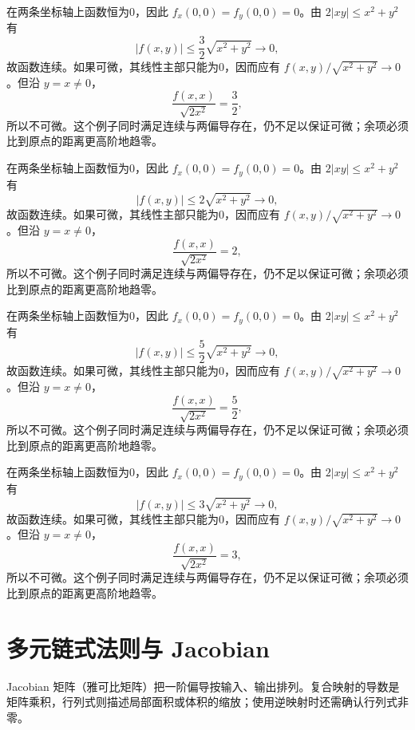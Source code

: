 \documentclass[12pt,fontset=fandol]{ctexart}
\begin{document}
\begin{solve}\label{ans:c32q22}
在两条坐标轴上函数恒为0，因此 $f_x(0,0)=f_y(0,0)=0$。由 $2|xy|\le x^2+y^2$ 有
\[
|f(x,y)|\le \frac{3}{2}\sqrt{x^2+y^2}\to0,
\]
故函数连续。如果可微，其线性主部只能为0，因而应有 $f(x,y)/\sqrt{x^2+y^2}\to0$。但沿 $y=x\ne0$，
\[
\frac{f(x,x)}{\sqrt{2x^2}}=\frac{3}{2},
\]
所以不可微。这个例子同时满足连续与两偏导存在，仍不足以保证可微；余项必须比到原点的距离更高阶地趋零。
\end{solve}

\begin{solve}\label{ans:c32q23}
在两条坐标轴上函数恒为0，因此 $f_x(0,0)=f_y(0,0)=0$。由 $2|xy|\le x^2+y^2$ 有
\[
|f(x,y)|\le 2\sqrt{x^2+y^2}\to0,
\]
故函数连续。如果可微，其线性主部只能为0，因而应有 $f(x,y)/\sqrt{x^2+y^2}\to0$。但沿 $y=x\ne0$，
\[
\frac{f(x,x)}{\sqrt{2x^2}}=2,
\]
所以不可微。这个例子同时满足连续与两偏导存在，仍不足以保证可微；余项必须比到原点的距离更高阶地趋零。
\end{solve}

\begin{solve}\label{ans:c32q24}
在两条坐标轴上函数恒为0，因此 $f_x(0,0)=f_y(0,0)=0$。由 $2|xy|\le x^2+y^2$ 有
\[
|f(x,y)|\le \frac{5}{2}\sqrt{x^2+y^2}\to0,
\]
故函数连续。如果可微，其线性主部只能为0，因而应有 $f(x,y)/\sqrt{x^2+y^2}\to0$。但沿 $y=x\ne0$，
\[
\frac{f(x,x)}{\sqrt{2x^2}}=\frac{5}{2},
\]
所以不可微。这个例子同时满足连续与两偏导存在，仍不足以保证可微；余项必须比到原点的距离更高阶地趋零。
\end{solve}

\begin{solve}\label{ans:c32q25}
在两条坐标轴上函数恒为0，因此 $f_x(0,0)=f_y(0,0)=0$。由 $2|xy|\le x^2+y^2$ 有
\[
|f(x,y)|\le 3\sqrt{x^2+y^2}\to0,
\]
故函数连续。如果可微，其线性主部只能为0，因而应有 $f(x,y)/\sqrt{x^2+y^2}\to0$。但沿 $y=x\ne0$，
\[
\frac{f(x,x)}{\sqrt{2x^2}}=3,
\]
所以不可微。这个例子同时满足连续与两偏导存在，仍不足以保证可微；余项必须比到原点的距离更高阶地趋零。
\end{solve}

\clearpage
\section{多元链式法则与 Jacobian}\label{sec:ch33}
Jacobian 矩阵（雅可比矩阵）把一阶偏导按输入、输出排列。复合映射的导数是矩阵乘积，行列式则描述局部面积或体积的缩放；使用逆映射时还需确认行列式非零。
\end{document}
